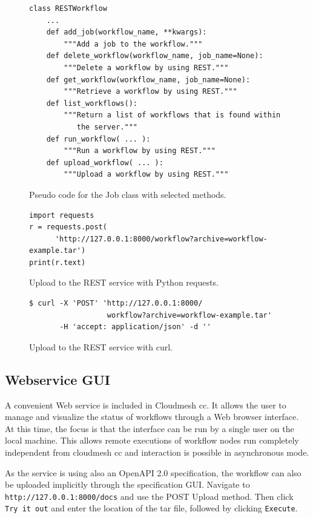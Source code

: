 \documentclass[sigplan,screen]{acmart}
\begin{document}
\begin{figure}[t]
{\scriptsize
\begin{verbatim}
class RESTWorkflow
    ...
    def add_job(workflow_name, **kwargs):
        """Add a job to the workflow."""
    def delete_workflow(workflow_name, job_name=None):
        """Delete a workflow by using REST."""
    def get_workflow(workflow_name, job_name=None):
        """Retrieve a workflow by using REST."""
    def list_workflows():
        """Return a list of workflows that is found within
           the server."""
    def run_workflow( ... ):
        """Run a workflow by using REST."""
    def upload_workflow( ... ):
        """Upload a workflow by using REST."""
\end{verbatim}}
\caption{Pseudo code for the Job class with selected methods.}
\label{fig:code-workflow-rest-commandline}

\bigskip

{\scriptsize
\begin{verbatim}
import requests
r = requests.post(
      'http://127.0.0.1:8000/workflow?archive=workflow-example.tar')
print(r.text)
\end{verbatim}}
\caption{Upload to the REST service with Python requests.}
\label{fig:code-workflow-requests}

\bigskip

{\scriptsize
\begin{verbatim}
$ curl -X 'POST' 'http://127.0.0.1:8000/ 
                  workflow?archive=workflow-example.tar'
       -H 'accept: application/json' -d ''
\end{verbatim}}
\caption{Upload to the REST service with curl.}
\label{fig:code-workflow-curl}

\end{figure}


\subsection{Webservice GUI}

A convenient Web service is included in Cloudmesh cc. It allows the
user to manage and visualize the status of workflows through a Web
browser interface. At this time, the focus is that the interface can
be run by a single user on the local machine. This allows remote
executions of workflow nodes run completely independent from cloudmesh
cc and interaction is possible in asynchronous mode.

As the service is using also an OpenAPI 2.0 specification, the
workflow can also be uploaded implicitly through the specification
GUI. Navigate to {\scriptsize \texttt{http://127.0.0.1:8000/docs}} and
use the POST Upload method. Then click {\scriptsize \texttt{Try\ it\ out}}
and enter the location of the tar file, followed by clicking
{\scriptsize \texttt{Execute}}.
\end{document}
